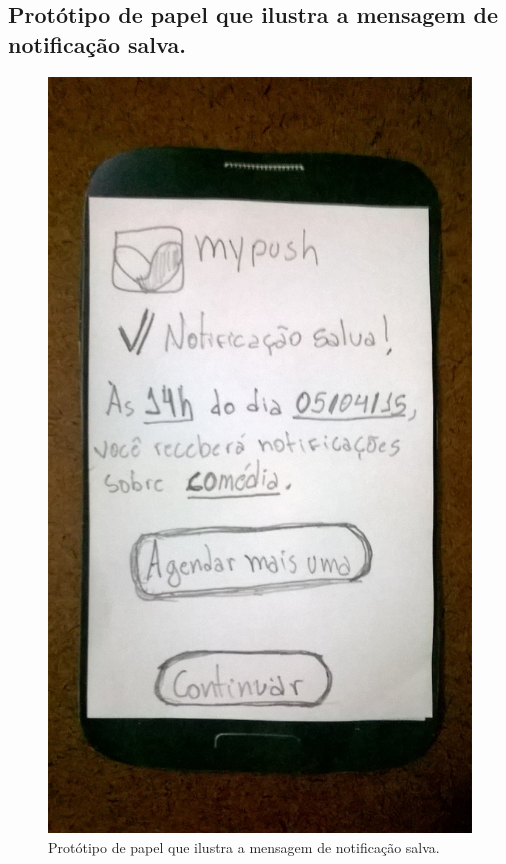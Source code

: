 \begin{apendicesenv}
    \pagebreak
    \section*{Protótipo de papel que ilustra a mensagem de notificação salva.}
    
      \begin{figure}[!htbp]
	\centering
	\includegraphics[scale=0.32, angle=-90]{editaveis/figuras/prototipo_papel_v1/notificacao_salva}
	\caption{Protótipo de papel que ilustra a mensagem de notificação salva.}
	\label{notificacao_salva_v1}
      \end{figure}
    

\end{apendicesenv}
